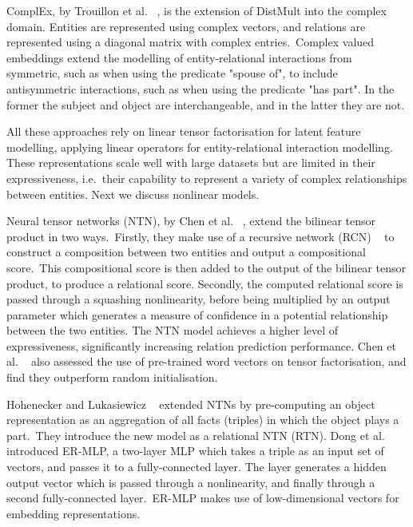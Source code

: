 \noindent ComplEx, by Trouillon et al. \unskip~\citep{trouillon2016complex}, is the extension of DistMult into the complex domain. Entities are represented using complex vectors, and relations are represented using a diagonal matrix with complex entries.\ Complex valued embeddings extend the modelling of entity-relational interactions from symmetric, such as when using the predicate "spouse of", to include antisymmetric interactions, such as when using the predicate "has part". In the former the subject and object are interchangeable, and in the latter they are not. \par

\noindent All these approaches rely on linear tensor factorisation for latent feature modelling, applying linear operators for entity-relational interaction modelling. These representations scale well with large datasets but are limited in their expressiveness, i.e.\  their capability to represent a variety of complex relationships between entities. Next we discuss nonlinear models. \par

\noindent Neural tensor networks (NTN), by Chen et al. \unskip~\citep{socher2013reasoning}, extend the bilinear tensor product in two ways.\ Firstly, they make use of a recursive network (RCN) \unskip~\citep{socher2012semantic} to construct a composition between two entities and output a compositional score.\ This compositional score is then added to the output of the bilinear tensor product, to produce a relational score. Secondly, the computed relational score is passed through a squashing nonlinearity, before being multiplied by an output parameter which generates a measure of confidence in a potential relationship between the two entities. The NTN model achieves a higher level of expressiveness, significantly increasing relation prediction performance. Chen et al. \unskip~\citep{socher2013reasoning} also assessed the use of pre-trained word vectors on tensor factorisation, and find they outperform random initialisation. \par

\noindent Hohenecker and Lukasiewicz \unskip~\citep{hohenecker2017deep} extended NTNs by pre-computing an object representation as an aggregation of all facts (triples) in which the object plays a part.\ They introduce the new model as a relational NTN (RTN). Dong et al. \unskip~\citep{dong2014knowledge} introduced ER-MLP, a two-layer MLP which takes a triple as an input set of vectors, and passes it to a fully-connected layer. The layer generates a hidden output vector which is passed through a nonlinearity, and finally through a second fully-connected layer.\ ER-MLP makes use of low-dimensional vectors for embedding representations. \par


